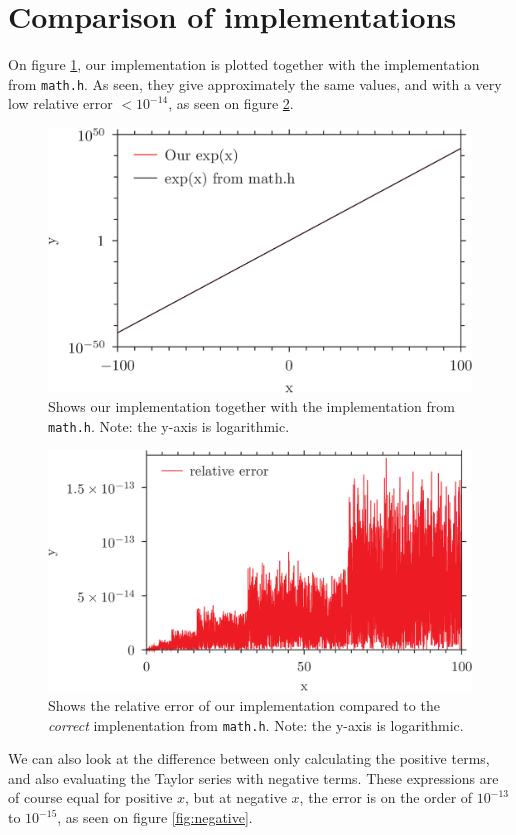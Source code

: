 \documentclass{article}
\begin{document}
\section{Comparison of implementations}
On figure \ref{fig:1}, our implementation is plotted together with the implementation from \texttt{math.h}. As seen, they give approximately the same values, and with a very low relative error $<10^{-14}$, as seen on figure \ref{fig:relative}.
\begin{figure}[h]
	\centering
	\includegraphics{plot1.png}
	\caption{Shows our implementation together with the implementation from \texttt{math.h}. Note: the y-axis is logarithmic.}
	\label{fig:1}
\end{figure}
\begin{figure}[h]
	\includegraphics{plot2.png}
	\caption{Shows the relative error of our implementation compared to the \textit{correct} implenentation from \texttt{math.h}. Note: the y-axis is logarithmic.}
	\label{fig:relative}
\end{figure}
We can also look at the difference between only calculating the positive terms, and also evaluating the Taylor series with negative terms. These expressions are of course equal for positive $ x $, but at negative $ x $, the error is on the order of $ 10^{-13}$ to $10^{-15} $, as seen on figure \ref{fig:negative}.
\end{document}
